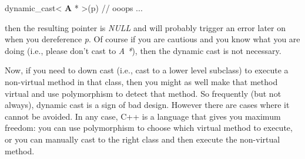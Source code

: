 \documentclass[
]{article}
\begin{document}
dynamic\_cast\textless{} \textbf{A} * \textgreater(p) // ooops ...

then the resulting pointer is \emph{NULL} and will probably trigger an
error later on when you dereference \emph{p}. Of course if you are
cautious and you know what you are doing (i.e., please don't cast to
\emph{A *}), then the dynamic cast is not necessary.

Now, if you need to down cast (i.e., cast to a lower level subclass) to
execute a non-virtual method in that class, then you might as well make
that method virtual and use polymorphism to detect that method. So
frequently (but not always), dynamic cast is a sign of bad design.
However there are cases where it cannot be avoided. In any case, C++ is
a language that gives you maximum freedom: you can use polymorphism to
choose which virtual method to execute, or you can manually cast to the
right class and then execute the non-virtual method.
\end{document}
